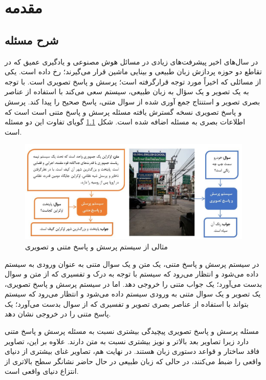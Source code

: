 

\chapter{مقدمه}
\section{شرح مسئله}
{
در سال‌های اخیر پیشرفت‌های زیادی در مسائل هوش مصنوعی و یادگیری عمیق که در تقاطع دو حوزه پردازش زبان طبیعی  و بینایی ماشین  قرار می‌گیرند؛ رخ داده است. یکی از مسائلی که اخیراً مورد توجه قرارگرفته است؛ پرسش و پاسخ تصویری  است. با توجه به یک تصویر و یک سؤال به زبان طبیعی، سیستم سعی می‌کند با استفاده از عناصر بصری تصویر و استنتاج جمع آوری شده از سوال متنی، پاسخ صحیح را پیدا کند. پرسش و پاسخ تصویری نسخه گسترش یافته مسئله پرسش و پاسخ متنی  است است که اطلاعات بصری به مسئله اضافه شده است. شکل \ref{fig:VQAExample}  گویای تفاوت این دو مسئله است.
	\begin{figure}
		\centerline{
			\includegraphics[scale=0.7]{images/1.JPG}}
		\caption{مثالی از سیستم پرسش و پاسخ متنی و تصویری}
		\label{fig:VQAExample}
	\end{figure}
	
	در سیستم پرسش و پاسخ متنی، یک متن و یک سوال متنی به عنوان ورودی به سیستم داده می‌شود و انتظار می‌رود که سیستم با توجه به درک و تفسیری که از متن و سوال بدست می‌آورد؛ یک جواب متنی را خروجی دهد. اما در سیستم پرسش و پاسخ تصویری، یک تصویر و یک سوال متنی به ورودی سیستم داده می‌شود و انتظار می‌رود که سیستم بتواند با استفاده از عناصر بصری تصویر و تفسیری که از سوال بدست می‌آورد؛ یک پاسخ متنی را در خروجی نشان دهد.
	
	مسئله پرسش و پاسخ تصویری پیچیدگی بیشتری نسبت به مسئله پرسش و پاسخ متنی دارد زیرا تصاویر بعد بالاتر و نویز بیشتری نسبت به متن دارند. علاوه بر این، تصاویر فاقد ساختار و قواعد دستوری زبان هستند. در نهایت هم، تصاویر غنای بیشتری از دنیای واقعی را ضبط می‌کنند، در حالی که زبان طبیعی در حال حاضر نشانگر سطح بالاتری از انتزاع دنیای واقعی است. 
	
}
